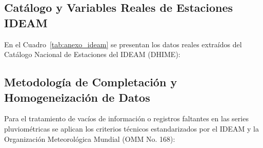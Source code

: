 \documentclass[11pt,a4paper]{article}
\begin{document}
\subsection*{Catálogo y Variables Reales de Estaciones IDEAM}
En el Cuadro~\ref{tab:anexo_ideam} se presentan los datos reales extraídos del Catálogo Nacional de Estaciones del IDEAM (DHIME):

\begin{table}[H]
\centering
\caption{Registro oficial de estaciones meteorológicas del IDEAM consultadas por HydroBasin.}
\label{tab:anexo_ideam}
\end{table}

\subsection*{Metodología de Completación y Homogeneización de Datos}
Para el tratamiento de vacíos de información o registros faltantes en las series pluviométricas se aplican los criterios técnicos estandarizados por el IDEAM y la Organización Meteorológica Mundial (OMM No. 168):
\end{document}
